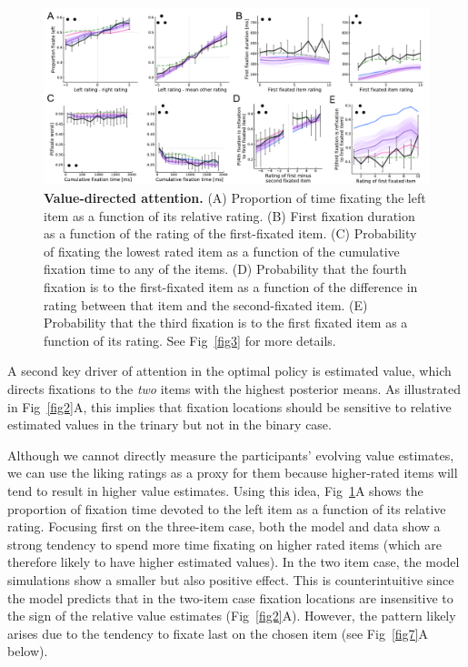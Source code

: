 \begin{figure}[t!]
  \centering
  \includegraphics[width=\textwidth]{figs/attention/Fig6.pdf}
  \caption{\textbf{Value-directed attention.}
  (A) Proportion of time fixating the left item as a function of its relative rating.
  (B) First fixation duration as a function of the rating of the first-fixated item.
  (C) Probability of fixating the lowest rated item as a function of the cumulative fixation time to any of the items.
  (D) Probability that the fourth fixation is to the first-fixated item as a function of the difference in rating between that item and the second-fixated item.
  (E) Probability that the third fixation is to the first fixated item as a function of its rating.
  See Fig~\ref{fig3} for more details.
  }
  \label{fig6}
\end{figure}

 
A second key driver of attention in the optimal policy is estimated value, which directs fixations to the \emph{two} items with the highest posterior means. As illustrated in Fig~\ref{fig2}A, this implies that fixation locations should be sensitive to relative estimated values in the trinary but not in the binary case.

Although we cannot directly measure the participants' evolving value estimates, we can use the liking ratings as a proxy for them because higher-rated items will tend to result in higher value estimates. Using this idea, Fig~\ref{fig6}A shows the proportion of fixation time devoted to the left item as a function of its relative rating. Focusing first on the three-item case, both the model and data show a strong tendency to spend more time fixating on higher rated items (which are therefore likely to have higher estimated values). In the two item case, the model simulations show a smaller but also positive effect. This is counterintuitive since the model predicts that in the two-item case fixation locations are insensitive to the sign of the relative value estimates (Fig~\ref{fig2}A). However, the pattern likely arises due to the tendency to fixate last on the chosen item (see Fig~\ref{fig7}A below).

